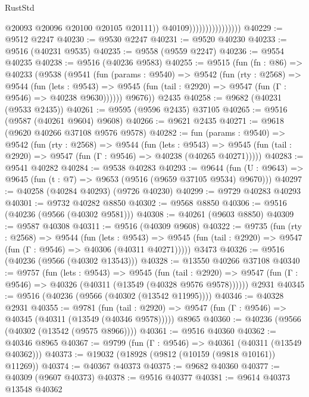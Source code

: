 \begin{lexlean}{RustStd}
\begin{coremodule}
                                        @20093
                                        @20096
                                        @20100
                                        @20105
                                        @20111))
                                    @40109))))))))))))))))
@40229 := @9512 @2247
@40230 := @9530 @2247
@40231 := @9520 @40230
@40233 := @9516 (@40231 @9535)
@40235 := @9558 (@9559 @2247)
@40236 := @9554 @40235
@40238 := @9516 (@40236 @9583)
@40255 := @9515
    (fun (fn : @86) =>
    @40233
      (@9538
        (@9541
          (fun (params : @9540) =>
          @9542
            (fun (rty : @2568) =>
            @9544
              (fun (lets : @9543) =>
              @9545 (fun (tail : @2920) => @9547 (fun (Γ : @9546) => @40238 @9630))))))
        @9676))
    @2435
@40258 := @9682 (@40231 (@9533 @2435))
@40261 := @9595 (@9596 @2435) @37105
@40265 := @9516 (@9587 (@40261 @9604) @9608)
@40266 := @9621 @2435
@40271 := @9618 (@9620 @40266 @37108 @9576 @9578)
@40282 := fun (params : @9540) =>
  @9542
    (fun (rty : @2568) =>
    @9544
      (fun (lets : @9543) =>
      @9545 (fun (tail : @2920) => @9547 (fun (Γ : @9546) => @40238 (@40265 @40271)))))
@40283 := @9541 @40282
@40284 := @9538 @40283
@40293 := @9644
    (fun (U : @9643) => @9645 (fun (t : @7) => @9653 (@9516 (@9659 @37105 @9534) @9670)))
@40297 := @40258 (@40284 @40293) (@9726 @40230)
@40299 := @9729 @40283 @40293
@40301 := @9732 @40282 @8850
@40302 := @9568 @8850
@40306 := @9516 (@40236 (@9566 (@40302 @9581)))
@40308 := @40261 (@9603 @8850)
@40309 := @9587 @40308
@40311 := @9516 (@40309 @9608)
@40322 := @9735
    (fun (rty : @2568) =>
    @9544
      (fun (lets : @9543) =>
      @9545 (fun (tail : @2920) => @9547 (fun (Γ : @9546) => @40306 (@40311 @40271)))))
    @3473
@40326 := @9516 (@40236 (@9566 (@40302 @13543)))
@40328 := @13550 @40266 @37108
@40340 := @9757
    (fun (lets : @9543) =>
    @9545
      (fun (tail : @2920) =>
      @9547 (fun (Γ : @9546) => @40326 (@40311 (@13549 (@40328 @9576 @9578))))))
    @2931
@40345 := @9516 (@40236 (@9566 (@40302 (@13542 @11995))))
@40346 := @40328 @2931
@40355 := @9781
    (fun (tail : @2920) => @9547 (fun (Γ : @9546) => @40345 (@40311 (@13549 (@40346 @9578)))))
    @8965
@40360 := @40236 (@9566 (@40302 (@13542 (@9575 @8966))))
@40361 := @9516 @40360
@40362 := @40346 @8965
@40367 := @9799 (fun (Γ : @9546) => @40361 (@40311 (@13549 @40362)))
@40373 := @19032 (@18928 (@9812 (@10159 (@9818 @10161)) @11269))
@40374 := @40367 @40373
@40375 := @9682 @40360
@40377 := @40309 (@9607 @40373)
@40378 := @9516 @40377
@40381 := @9614 @40373 @13548 @40362

\end{coremodule}
\end{lexlean}
